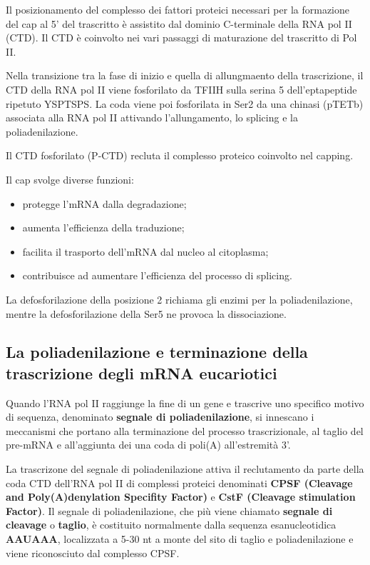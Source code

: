\documentclass[11pt]{book}
\begin{document}
Il posizionamento del complesso dei fattori proteici necessari per la
formazione del cap al 5' del trascritto è assistito dal dominio
C-terminale della RNA pol II (CTD). Il CTD è coinvolto nei vari passaggi
di maturazione del trascritto di Pol II.

Nella transizione tra la fase di inizio e quella di allungmaento della
trascrizione, il CTD della RNA pol II viene fosforilato da TFIIH sulla
serina 5 dell'eptapeptide ripetuto YSPTSPS. La coda viene poi
fosforilata in Ser2 da una chinasi (pTETb) associata alla RNA pol II
attivando l'allungamento, lo splicing e la poliadenilazione.

Il CTD fosforilato (P-CTD) recluta il complesso proteico coinvolto nel
capping.

Il cap svolge diverse funzioni:

\begin{itemize}
\itemsep1pt\parskip0pt
\item
  protegge l'mRNA dalla degradazione;
\item
  aumenta l'efficienza della traduzione;
\item
  facilita il trasporto dell'mRNA dal nucleo al citoplasma;
\item
  contribuisce ad aumentare l'efficienza del processo di splicing.
\end{itemize}

La defosforilazione della posizione 2 richiama gli enzimi per la
poliadenilazione, mentre la defosforilazione della Ser5 ne provoca la
dissociazione.

\subsection{La poliadenilazione e terminazione della trascrizione
degli mRNA
eucariotici}\label{la-poliadenilazione-e-terminazione-della-trascrizione-degli-mrna-eucariotici}

Quando l'RNA pol II raggiunge la fine di un gene e trascrive uno
specifico motivo di sequenza, denominato \textbf{segnale di
poliadenilazione}, si innescano i meccanismi che portano alla
terminazione del processo trascrizionale, al taglio del pre-mRNA e
all'aggiunta dei una coda di poli(A) all'estremità 3'.

La trascrizone del segnale di poliadenilazione attiva il reclutamento da
parte della coda CTD dell'RNA pol II di complessi proteici denominati
\textbf{CPSF (Cleavage and Poly(A)denylation Specifity Factor)} e
\textbf{CstF (Cleavage stimulation Factor)}. Il segnale di
poliadenilazione, che più viene chiamato \textbf{segnale di cleavage} o
\textbf{taglio}, è costituito normalmente dalla sequenza esanucleotidica
\textbf{AAUAAA}, localizzata a 5-30 nt a monte del sito di taglio e
poliadenilazione e viene riconosciuto dal complesso CPSF.
\end{document}
